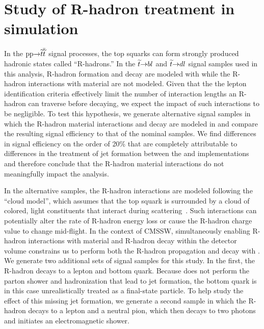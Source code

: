 \chapter{Study of R-hadron treatment in simulation}
\label{r_hadrons}

In the $\mathrm{p}\mathrm{p} {\to} \widetilde{t} \overline{\widetilde{t}}$ signal processes, the top squarks can form strongly produced \linebreak[4]hadronic states called ``R-hadrons.'' In the $\widetilde{t} {\to} b l$ and $\widetilde{t} {\to} d l$ signal samples used in this analysis, R-hadron formation and decay are modeled with \PYTHIA while the R-hadron interactions with material are not modeled. Given that the the lepton identification criteria effectively limit the number of interaction lengths an R-hadron can traverse before decaying, we expect the impact of such interactions to be negligible. To test this hypothesis, we generate alternative signal samples in which the R-hadron material interactions and decay are modeled in \GEANTfour and compare the resulting signal efficiency to that of the nominal samples. We find differences in signal efficiency on the order of 20\% that are completely attributable to differences in the treatment of jet formation between the \PYTHIA and \GEANTfour implementations and therefore conclude that the R-hadron material interactions do not meaningfully impact the analysis.

In the alternative samples, the R-hadron interactions are modeled following the ``cloud model'', which assumes that the top squark is surrounded by a cloud of colored, light constituents that interact during scattering~\cite{mackeprang_2006,mackeprang_2009}. Such interactions can potentially alter the rate of R-hadron energy loss or cause the R-hadron charge value to change mid-flight. In the context of CMSSW, simultaneously enabling R-hadron interactions with material and R-hadron decay within the detector volume constrains us to perform both the R-hadron propagation and decay with \GEANTfour. We generate two additional sets of signal samples for this study. In the first, the R-hadron decays to a lepton and bottom quark. Because \GEANTfour does not perform the parton shower and hadronization that lead to jet formation, the bottom quark is in this case unrealistically treated as a final-state particle. To help study the effect of this missing jet formation, we generate a second sample in which the R-hadron decays to a lepton and a neutral pion, which then decays to two photons and initiates an electromagnetic shower.

